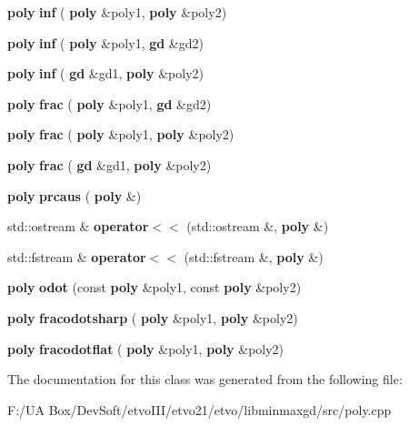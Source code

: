 \begin{DoxyCompactItemize}
\textbf{ poly} {\bfseries inf} (\textbf{ poly} \&poly1, \textbf{ poly} \&poly2)
\item 
\mbox{\label{classmmgd_1_1mmgd_1_1poly_a03fcc1a1d0999a26f741958726ad8786}} 
\textbf{ poly} {\bfseries inf} (\textbf{ poly} \&poly1, \textbf{ gd} \&gd2)
\item 
\mbox{\label{classmmgd_1_1mmgd_1_1poly_a201336586d8f06607e606a71d56d0620}} 
\textbf{ poly} {\bfseries inf} (\textbf{ gd} \&gd1, \textbf{ poly} \&poly2)
\item 
\mbox{\label{classmmgd_1_1mmgd_1_1poly_a1ca2365b15ec5d9647e2ee8cc82bc0c3}} 
\textbf{ poly} {\bfseries frac} (\textbf{ poly} \&poly1, \textbf{ gd} \&gd2)
\item 
\mbox{\label{classmmgd_1_1mmgd_1_1poly_a2bb496ce83846bee4b6273821e059827}} 
\textbf{ poly} {\bfseries frac} (\textbf{ poly} \&poly1, \textbf{ poly} \&poly2)
\item 
\mbox{\label{classmmgd_1_1mmgd_1_1poly_af8dd7f52f6fa54f4f40d657652b14a54}} 
\textbf{ poly} {\bfseries frac} (\textbf{ gd} \&gd1, \textbf{ poly} \&poly2)
\item 
\mbox{\label{classmmgd_1_1mmgd_1_1poly_ad9580516418e4c9c5ee22b7f67cfb6ee}} 
\textbf{ poly} {\bfseries prcaus} (\textbf{ poly} \&)
\item 
\mbox{\label{classmmgd_1_1mmgd_1_1poly_a0361c355a8ea5d7e13ec20144390082f}} 
std\+::ostream \& {\bfseries operator$<$$<$} (std\+::ostream \&, \textbf{ poly} \&)
\item 
\mbox{\label{classmmgd_1_1mmgd_1_1poly_af0ab9a74b034ed507c6070d9a47951b8}} 
std\+::fstream \& {\bfseries operator$<$$<$} (std\+::fstream \&, \textbf{ poly} \&)
\item 
\mbox{\label{classmmgd_1_1mmgd_1_1poly_a9cecbf55fe370b38e24b8b639fd1ee03}} 
\textbf{ poly} {\bfseries odot} (const \textbf{ poly} \&poly1, const \textbf{ poly} \&poly2)
\item 
\mbox{\label{classmmgd_1_1mmgd_1_1poly_aff323f3e36b51b89ff4b52ffdf7464dd}} 
\textbf{ poly} {\bfseries fracodotsharp} (\textbf{ poly} \&poly1, \textbf{ poly} \&poly2)
\item 
\mbox{\label{classmmgd_1_1mmgd_1_1poly_ad284d1dbb550ed9c6a6ad3f9f3e2e3cc}} 
\textbf{ poly} {\bfseries fracodotflat} (\textbf{ poly} \&poly1, \textbf{ poly} \&poly2)
\end{DoxyCompactItemize}


The documentation for this class was generated from the following file\+:\begin{DoxyCompactItemize}
\item 
F\+:/\+U\+A Box/\+Dev\+Soft/etvo\+I\+I\+I/etvo21/etvo/libminmaxgd/src/poly.\+cpp\end{DoxyCompactItemize}
